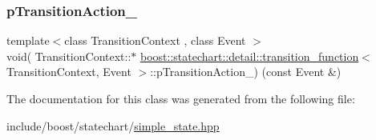 \mbox{\label{classboost_1_1statechart_1_1detail_1_1transition__function_a33ea5026ee41a5a9d03ebac6eaa33a60}} 
\subsubsection{\texorpdfstring{p\+Transition\+Action\+\_\+}{pTransitionAction\_}}
{\footnotesize\ttfamily template$<$class Transition\+Context , class Event $>$ \\
void( Transition\+Context\+::$\ast$ \mbox{\hyperlink{classboost_1_1statechart_1_1detail_1_1transition__function}{boost\+::statechart\+::detail\+::transition\+\_\+function}}$<$ Transition\+Context, Event $>$\+::p\+Transition\+Action\+\_\+) (const Event \&)\hspace{0.3cm}{\ttfamily [private]}}



The documentation for this class was generated from the following file\+:\begin{DoxyCompactItemize}
\item 
include/boost/statechart/\mbox{\hyperlink{simple__state_8hpp}{simple\+\_\+state.\+hpp}}\end{DoxyCompactItemize}
